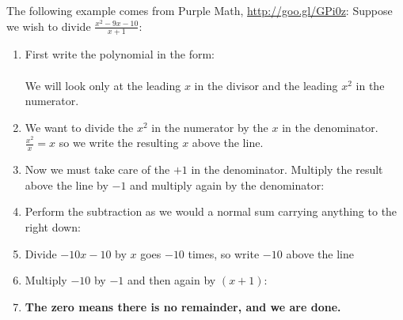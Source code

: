 The following example comes from Purple Math, \url{http://goo.gl/GPi0z}:
Suppose we wish to divide $\frac{x^2 -9x -10}{x+1}$:
\begin{enumerate}
  \item First write the polynomial in the form:
  \\  \\[0.5cm]
  We will look only at the leading $x$ in the divisor and the leading $x^2$ in
  the numerator. 
  \item We want to divide the $x^2$ in the numerator by the $x$ in the
  denominator. $\frac{x^2}{x} = x$ so we write the resulting $x$ above the line.
  \\ 
  \item Now we must take care of the $+1$ in the denominator. Multiply the
  result above the line by $-1$ and multiply again by the denominator:
  \\ 
  \item Perform the subtraction as we would a normal sum carrying anything to
  the right down:
  \\ 
  \item Divide $-10x -10$ by $x$ goes $-10$ times, so write $-10$ above the line
  \\  
  \item Multiply $-10$ by $-1$ and then again by $(x+1)$:
  \\ 
  \item \textbf{The zero means there is no remainder, and we are done.}
\end{enumerate}

